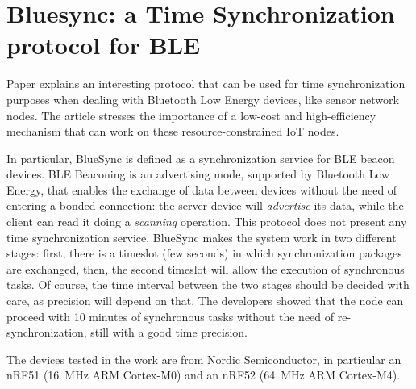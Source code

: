 \section{Bluesync: a Time Synchronization protocol for BLE}
Paper \cite{asgarian2021bluesync} explains an interesting protocol that can be used for time synchronization purposes when dealing with Bluetooth Low Energy devices, like sensor network nodes. The article stresses the importance of a low-cost and high-efficiency mechanism that can work on these resource-constrained IoT nodes.  

In particular, BlueSync is defined as a synchronization service for BLE beacon devices. BLE Beaconing is an advertising mode, supported by Bluetooth Low Energy, that enables the exchange of data between devices without the need of entering a bonded connection: the server device will \textit{advertise} its data, while the client can read it doing a \textit{scanning} operation. This protocol does not present any time synchronization service. 
BlueSync makes the system work in two different stages: first, there is a timeslot (few seconds) in which synchronization packages are exchanged, then, the second timeslot will allow the execution of synchronous tasks. Of course, the time interval between the two stages should be decided with care, as precision will depend on that. The developers showed that the node can proceed with 10 minutes of synchronous tasks without the need of re-synchronization, still with a good time precision. 

The devices tested in the work are from Nordic Semiconductor, in particular an nRF51 (16~MHz ARM Cortex-M0) and an nRF52 (64~MHz ARM Cortex-M4).

